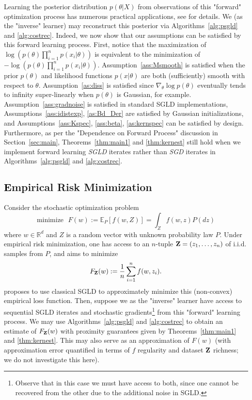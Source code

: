 \documentclass[journal,onecolumn]{IEEEtran}
\newcommand{\grad}{\nabla}
\newcommand{\reals}{\mathbb{R}}
\newcommand{\CE}{\mathbb{E}}
\begin{document}
{Learning the posterior distribution $p(\theta|X)$ from observations of this "forward" optimization process has numerous practical applications, see \cite{krishnamurthy2021langevin} for details. We (as the "inverse" learner) may reconstruct this posterior via Algorithms~\ref{alg:psgld} and \ref{alg:costrec}. Indeed, we now show that our assumptions can be satisfied by this forward learning process. First, notice that the maximization 
 of $\log \left(p(\theta)\prod_{i=1}^n  p(x_i|\theta)\right)$ is equivalent to the minimization of $-\log \left(p(\theta)\prod_{i=1}^n p(x_i|\theta)\right)$. Assumption~\ref{ass:Msmooth} is satisfied when the prior $p(\theta)$ and likelihood functions $p(x|\theta)$ are both (sufficiently) smooth with respect to $\theta$. Assumption~\ref{as:diss} is satisfied since $\grad_{\theta}\log p(\theta)$ eventually tends to infinity super-linearly when $p(\theta)$ is Gaussian, for example. Assumption~\ref{ass:gradnoise} is satisfied in standard SGLD implementations, Assumptions~\ref{ass:idistexp}, \ref{as:Bd_Der} are satisfied by Gaussian initializations, and Assumptions~\ref{ass:Kspec}, \ref{ass:beta}, \ref{as:kernspec} can be satisfied by design. Furthermore, as per the "Dependence on Forward Process" discussion in Section~\ref{sec:main}, Theorems~\ref{thm:main1} and \ref{thm:kernest} still hold when we implement forward learning \textit{SGLD} iterates rather than \textit{SGD} iterates in Algorithms~\ref{alg:psgld} and \ref{alg:costrec}.


\vspace{0.1cm}
\subsection{\textcolor{black} Empirical Risk Minimization}
Consider the stochastic optimization problem 
\[\textrm{minimize } \,\, F(w) := \CE_{P}[f(w,Z)] = \int_Z f(w,z)P(dz)\]
where $w \in \reals^d$ and $Z$ is a random vector with unknown probability law $P$. Under empirical risk minimization, one has access to an $n$-tuple $\bold{Z} = (z_1,\dots,z_n)$ of i.i.d. samples from $P$, and aims to minimize 
\[F_{\bold{Z}}(w) := \frac{1}{n}\sum_{i=1}^n f(w,z_i).\]
 \cite{raginsky2017non} proposes to use classical SGLD to approximately minimize this (non-convex) empirical loss function. Then, suppose we as the "inverse" learner have access to sequential SGLD iterates and stochastic gradients\footnote{Observe that in this case we must have access to both, since one cannot be recovered from the other due to the additional noise in SGLD.} from this "forward" learning process. We may use Algorithms~\ref{alg:psgld} and \ref{alg:costrec} to obtain an estimate of $F_{\bold{Z}}(w)$ with proximity guarantees given by Theorems~\ref{thm:main1} and \ref{thm:kernest}. This may also serve as an approximation of $F(w)$ (with approximation error quantified in terms of $f$ regularity and dataset $\bold{Z}$ richness; we do not investigate this here). 
 
}
\end{document}

